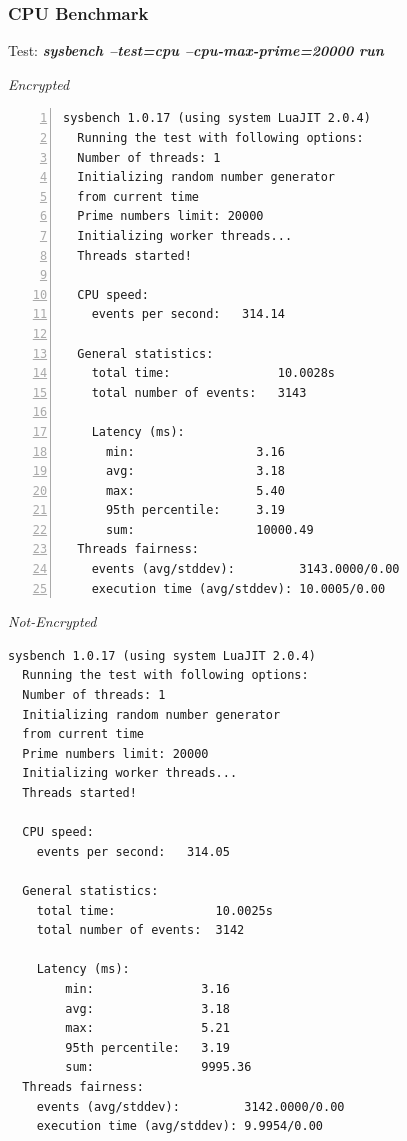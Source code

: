 \subsubsection{CPU Benchmark}
\begin{center}
  Test: \textbf{\textit{sysbench --test=cpu --cpu-max-prime=20000 run}}  
\end{center}
\vspace*{-\baselineskip}
\noindent\begin{minipage}[t]{0.45\linewidth}
  \centering
  \textit{Encrypted}
  \lstset{language=bash,label=SliceExaple}
  \begin{lstlisting}[basicstyle=\tiny,frame=single, numbers=left, label=cpu_test1]
  sysbench 1.0.17 (using system LuaJIT 2.0.4)  
  Running the test with following options:
  Number of threads: 1
  Initializing random number generator
  from current time
  Prime numbers limit: 20000
  Initializing worker threads...
  Threads started!
  
  CPU speed:
    events per second:   314.14
  
  General statistics:
    total time:               10.0028s
    total number of events:   3143
  
    Latency (ms):
      min:                 3.16
      avg:                 3.18
      max:                 5.40
      95th percentile:     3.19
      sum:                 10000.49 
  Threads fairness:
    events (avg/stddev):         3143.0000/0.00
    execution time (avg/stddev): 10.0005/0.00        
  \end{lstlisting}
\end{minipage}
\hspace{0.5cm}
\noindent\begin{minipage}[t]{0.45\linewidth}
  \centering
  \textit{Not-Encrypted}
  \begin{lstlisting}[basicstyle=\tiny,frame=single, label=cpu_test2]
  sysbench 1.0.17 (using system LuaJIT 2.0.4)
  Running the test with following options:
  Number of threads: 1
  Initializing random number generator
  from current time
  Prime numbers limit: 20000
  Initializing worker threads...
  Threads started!

  CPU speed:
    events per second:   314.05

  General statistics:
    total time:              10.0025s
    total number of events:  3142

    Latency (ms):
        min:               3.16
        avg:               3.18
        max:               5.21
        95th percentile:   3.19
        sum:               9995.36
  Threads fairness:
    events (avg/stddev):         3142.0000/0.00
    execution time (avg/stddev): 9.9954/0.00
  \end{lstlisting}
\end{minipage}

